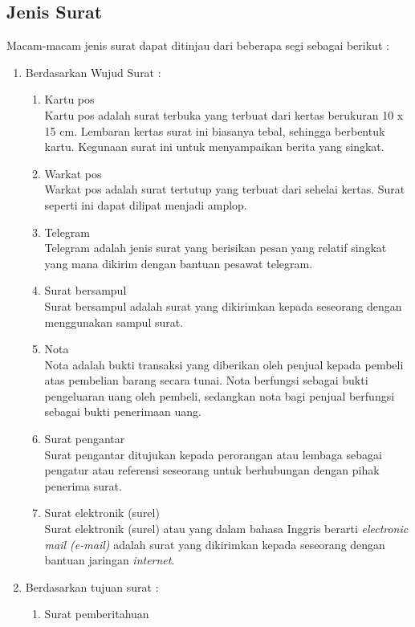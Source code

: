 \subsection{Jenis Surat}
\label{sec:jenis_surat}
Macam-macam jenis surat dapat ditinjau dari beberapa segi sebagai berikut \cite{Saiman:2002}: 
\begin{enumerate}
	\item Berdasarkan Wujud Surat : 
	\begin{enumerate}
		\item Kartu pos \\
		Kartu pos adalah surat terbuka yang terbuat dari kertas berukuran 10 x 15 cm. Lembaran kertas surat ini biasanya tebal, sehingga berbentuk kartu. Kegunaan surat ini untuk menyampaikan berita yang singkat. 
		\item Warkat pos \\
		Warkat pos adalah surat tertutup yang terbuat dari sehelai kertas. Surat seperti ini dapat dilipat menjadi amplop.
		\item Telegram \\
		Telegram adalah jenis surat yang berisikan pesan yang relatif singkat yang mana dikirim dengan bantuan pesawat telegram.
		\item Surat bersampul \\
		Surat bersampul adalah surat yang dikirimkan kepada seseorang dengan menggunakan sampul surat. 
		\item Nota \\
		Nota adalah bukti transaksi yang diberikan oleh penjual kepada pembeli atas pembelian barang secara tunai. Nota berfungsi sebagai bukti pengeluaran uang oleh pembeli, sedangkan nota bagi penjual berfungsi sebagai bukti penerimaan uang.
		\item Surat pengantar \\
		Surat pengantar ditujukan kepada perorangan atau lembaga sebagai pengatur atau referensi seseorang untuk berhubungan dengan pihak penerima surat.
		\item Surat elektronik (surel) \\
		Surat elektronik (surel) atau yang dalam bahasa Inggris berarti \textit{electronic mail (e-mail)} adalah surat yang dikirimkan kepada seseorang dengan bantuan jaringan \textit{internet}.
	\end{enumerate}
	\item Berdasarkan tujuan surat :
	\begin{enumerate}
		\item Surat pemberitahuan \\

\end{enumerate}
\end{enumerate}
